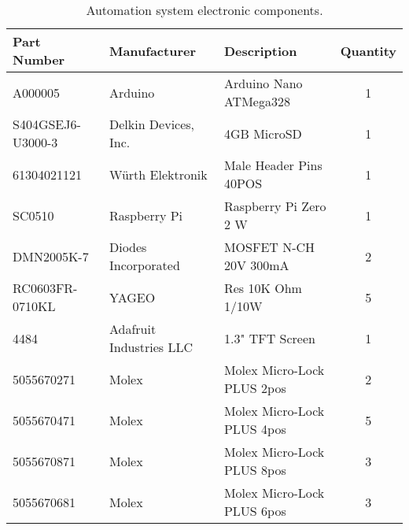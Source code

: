 \begin{table}[!ht]
    \centering
    \begin{tabular}{|l|l|l|c|}
    \hline
        Part Number         & Manufacturer              & Description                   & Quantity  \\ \hline
        A000005             & Arduino                   & Arduino Nano ATMega328        & 1         \\ \hline
        S404GSEJ6-U3000-3   & Delkin Devices, Inc.      & 4GB MicroSD                   & 1         \\ \hline
        61304021121         & Würth Elektronik          & Male Header Pins 40POS        & 1         \\ \hline
        SC0510              & Raspberry Pi              & Raspberry Pi Zero 2 W         & 1         \\ \hline
        DMN2005K-7          & Diodes Incorporated       & MOSFET N-CH 20V 300mA         & 2         \\ \hline
        RC0603FR-0710KL     & YAGEO                     & Res 10K Ohm 1/10W             & 5         \\ \hline
        4484                & Adafruit Industries LLC   & 1.3" TFT Screen               & 1         \\ \hline
        5055670271          & Molex                     & Molex Micro-Lock PLUS 2pos    & 2         \\ \hline
        5055670471          & Molex                     & Molex Micro-Lock PLUS 4pos    & 5         \\ \hline
        5055670871          & Molex                     & Molex Micro-Lock PLUS 8pos    & 3         \\ \hline
        5055670681          & Molex                     & Molex Micro-Lock PLUS 6pos    & 3         \\ \hline
    \end{tabular}
    \caption{Automation system electronic components.}
    \label{tab:automation_components}
\end{table}

\clearpage

